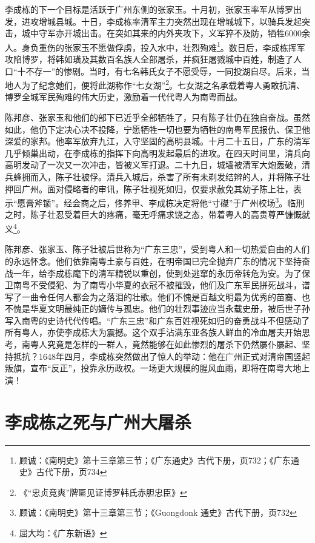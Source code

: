 李成栋的下一个目标是活跃于广州东侧的张家玉。十月初，张家玉率军从博罗出发，进攻增城县城。十日，李成栋率清军主力突然出现在增城城下，以骑兵发起突击，城中守军亦开城出击。在突如其来的内外夹攻下，义军猝不及防，牺牲6000余人。身负重伤的张家玉不愿做俘虏，投入水中，壮烈殉难\footnote{顾诚：《南明史》第十三章第三节；《广东通史》古代下册，页732；《广东通史》古代下册，页734}。数日后，李成栋挥军攻陷博罗，将韩如璜及其数百名族人全部屠杀，并疯狂屠戮城中百姓，制造了人口“十不存一”的惨剧。当时，有七名韩氏女子不愿受辱，一同投湖自尽。后来，当地人为了纪念她们，便将此湖称作“七女湖”\footnote{《“忠贞竞爽”牌匾见证博罗韩氏赤胆忠臣》}。七女湖之名承载着粤人勇敢抗清、博罗全城军民殉难的伟大历史，激励着一代代粤人为南粤而战。

陈邦彦、张家玉和他们的部下已近乎全部牺牲了，只有陈子壮仍在独自奋战。虽然如此，他仍下定决心决不投降，宁愿牺牲一切也要为牺牲的南粤军民报仇、保卫他深爱的家邦。他率军放弃九江，入守坚固的高明县城。十月二十五日，广东的清军几乎倾巢出动，在李成栋的指挥下向高明发起最后的进攻。在四天时间里，清兵向高明发动了一次又一次冲击，皆被义军打退。二十九日，城墙被清军大炮轰破，清兵蜂拥而入，陈子壮被俘。清兵入城后，杀害了所有未剃发结辫的人，并将陈子壮押回广州。面对侵略者的审讯，陈子壮视死如归，仅要求赦免其幼子陈上壮，表示“愿膏斧锧”。经会商之后，佟养甲、李成栋决定将他“寸磔”于广州校场\footnote{顾诚：《南明史》第十三章第三节；《Guongdonk 通史》古代下册，页732}。临刑之时，陈子壮忍受着巨大的疼痛，毫无呼痛求饶之态，带着粤人的高贵尊严慷慨就义\footnote{屈大均：《广东新语》}。

陈邦彦、张家玉、陈子壮被后世称为“广东三忠”，受到粤人和一切热爱自由的人们的永远怀念。他们依靠南粤土豪与百姓，在明帝国已完全抛弃广东的情况下坚持奋战一年，给李成栋麾下的清军精锐以重创，使到处逃窜的永历帝转危为安。为了保卫南粤不受侵犯、为了南粤小华夏的衣冠不被摧毁，他们及广东军民拼死战斗，谱写了一曲令任何人都会为之落泪的壮歌。他们不愧是百越文明最为优秀的苗裔、也不愧是华夏文明最纯正的嫡传与孤忠。他们的壮烈事迹应当永载史册，被后世子孙写入南粤的史诗代代传唱。“广东三忠”和广东百姓视死如归的奋勇战斗不但感动了所有粤人，亦使李成栋大为震撼。这个双手沾满东亚各族人鲜血的冷血屠夫开始思考，南粤人究竟是怎样的一群人，竟然能够在如此惨烈的屠杀下仍然屡仆屡起、坚持抵抗？1648年四月，李成栋突然做出了惊人的举动：他在广州正式对清帝国竖起叛旗，宣布“反正”，投靠永历政权。一场更大规模的腥风血雨，即将在南粤大地上演！

\section{李成栋之死与广州大屠杀}


